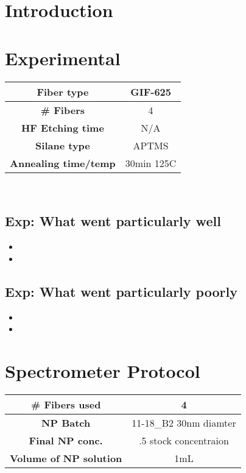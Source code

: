 \section{Introduction}

\section{Experimental}


\begin{center}
\begin{tabular}{| c | c |}
 \hline\hline
 {\bf Fiber type} & GIF-625 \\ \hline
 {\bf \# Fibers} & 4  \\ \hline
 {\bf HF Etching time} & N/A \\ \hline
 {\bf Silane type} & APTMS \\ \hline
 {\bf Annealing time/temp} & 30min 125C  \\ \hline
\end{tabular}
\end{center}

\\


\subsection{Exp: {\color{blue} What went particularly well}}

\begin{itemize}
\item{}
\item{}
\end{itemize}

\subsection{Exp: {\color{red} What went particularly poorly}}

\begin{itemize}
\item{}
\item{}
\end{itemize}

\section{Spectrometer Protocol}

\begin{center}
\begin{tabular}{| c | c |}
 \hline\hline
 {\bf # Fibers used} & 4 \\ \hline
 {\bf NP Batch} & 11-18\_B2 30nm diamter \\ \hline
 {\bf Final NP conc.} & .5 stock concentraion  \\ \hline
 {\bf Volume of NP solution} & 1mL \\ \hline
\end{tabular}
\end{center}

